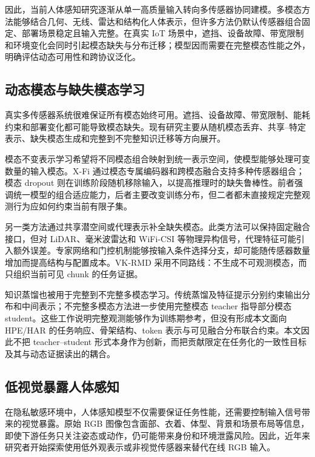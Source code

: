 \documentclass[journal]{IEEEtran}
\begin{document}
因此，当前人体感知研究逐渐从单一高质量输入转向多传感器协同建模\cite{sensorFusion,contrastivehar,iotHarReview}。多模态方法能够结合几何、无线、雷达和结构化人体表示，但许多方法仍默认传感器组合固定、部署场景稳定且输入完整。在真实 IoT 场景中，遮挡、设备故障、带宽限制和环境变化会同时引起模态缺失与分布迁移；模型因而需要在完整模态性能之外，明确评估动态可用性和跨协议泛化。

\subsection{动态模态与缺失模态学习}

真实多传感器系统很难保证所有模态始终可用。遮挡、设备故障、带宽限制、能耗约束和部署变化都可能导致模态缺失。现有研究主要从随机模态丢弃、共享--特定表示、缺失模态生成和完整到不完整知识迁移等方向展开\cite{missingSurvey,goodPracticeMissing,moddrop,shaspec}。

模态不变表示学习希望将不同模态组合映射到统一表示空间，使模型能够处理可变数量的输入模态。X-Fi 通过模态专属编码器和跨模态融合支持多种传感器组合\cite{xfi}；模态 dropout 则在训练阶段随机移除输入，以提高推理时的缺失鲁棒性\cite{moddrop}。前者强调统一模型的组合适应能力，后者主要改变训练分布，但二者都未直接规定完整观测行为应如何约束当前有限子集。

另一类方法通过共享潜空间或代理表示补全缺失模态。此类方法可以保持固定融合接口，但对 LiDAR、毫米波雷达和 WiFi-CSI 等物理异构信号，代理特征可能引入额外误差。专家网络和门控机制能够按输入条件选择分支，却可能随传感器数量增加而提高结构与配置成本。VK-RMD 采用不同路线：不生成不可观测模态，而只组织当前可见 chunk 的任务证据。

知识蒸馏也被用于完整到不完整多模态学习。传统蒸馏及特征提示分别约束输出分布和中间表示\cite{kd,fitnets,lupi}；不完整多模态方法进一步使用完整模态 teacher 指导部分模态 student\cite{incompleteKD,mmanet,crossModalKD}。这些工作说明完整观测能够作为训练期参考，但没有形成本文面向 HPE/HAR 的任务响应、骨架结构、token 表示与可见融合分布联合约束。本文因此不把 teacher--student 形式本身作为创新，而把贡献限定在任务化的一致性目标及其与动态证据读出的耦合。

\subsection{低视觉暴露人体感知}

在隐私敏感环境中，人体感知模型不仅需要保证任务性能，还需要控制输入信号带来的视觉暴露。原始 RGB 图像包含面部、衣着、体型、背景和场景布局等信息，即使下游任务只关注姿态或动作，仍可能带来身份和环境泄露风险。因此，近年来研究者开始探索使用低外观表示或非视觉传感器来替代在线 RGB 输入。
\end{document}
